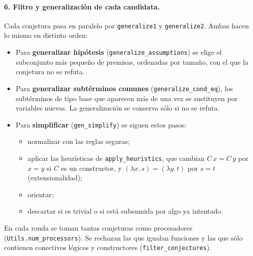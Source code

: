 \documentclass[11pt,a4paper]{article}
\newcommand{\isa}[1]{\texttt{#1}}
\theoremstyle{definition}
\theoremstyle{remark}
\begin{document}
\paragraph{6. Filtro y generalización de cada candidata.}
Cada conjetura pasa en paralelo por \isa{generalize1} y \isa{generalize2}. Ambas hacen
lo mismo en distinto orden:
\begin{itemize}[nosep]
  \item Para \textbf{generalizar hipótesis} (\isa{generalize\_assumptions}) se elige
        el subconjunto más pequeño de premisas, ordenadas por tamaño, con el que la
        conjetura no se refuta.
  \item Para \textbf{generalizar subtérminos comunes} (\isa{generalize\_cond\_eq}),
        los subtérminos de tipo base que aparecen más de una vez se sustituyen por
        variables nuevas. La generalización se conserva sólo si no se refuta.
  \item Para \textbf{simplificar} (\isa{gen\_simplify}) se siguen estos pasos:
    \begin{itemize}[nosep]
      \item normalizar con las reglas seguras;
      \item aplicar las heurísticas de \isa{apply\_heuristics}, que cambian
            $C\,x = C\,y$ por $x = y$ si $C$ es un constructor, y
            $(\lambda x.\,s) = (\lambda y.\,t)$ por $s = t$ (extensionalidad);
      \item orientar;
      \item descartar si es trivial o si está subsumida por algo ya intentado.
    \end{itemize}
\end{itemize}
En cada ronda se toman tantas conjeturas como procesadores
(\isa{Utils.num\_processors}). Se rechazan las que igualan funciones y las que sólo
contienen conectivos lógicos y constructores (\isa{filter\_conjectures}).
\end{document}
